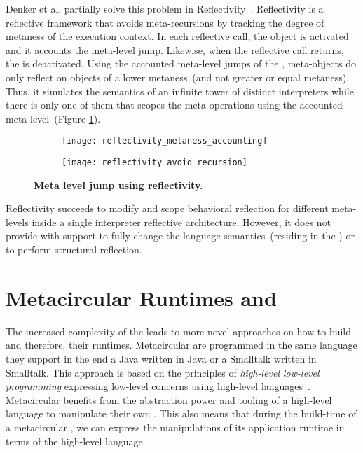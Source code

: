 Denker et al. partially solve this problem in Reflectivity~\cite{Denk08b}. Reflectivity is a reflective framework that avoids meta-recursions by tracking the degree of metaness of the execution context. In each reflective call, the  object is activated and it accounts the meta-level jump. Likewise, when the reflective call returns, the  is deactivated. Using the accounted meta-level jumps of the , meta-objects do only reflect on objects of a lower metaness~(and not greater or equal metaness). Thus, it simulates the semantics of an infinite tower of distinct interpreters while there is only one of them that scopes the meta-operations using the accounted meta-level~(Figure \ref{fig:reflectivity_avoid_meta_recursion}).

\begin{figure}[ht]
\begin{center}
\begin{subfigure}{.45\textwidth}
\texttt{[image: reflectivity\_metaness\_accounting]}
\end{subfigure}
\begin{subfigure}{.45\textwidth}
\texttt{[image: reflectivity\_avoid\_recursion]}
\end{subfigure}
\caption{\textbf{Meta level jump using reflectivity.}\label{fig:reflectivity_avoid_meta_recursion}
 }
\end{center}
\end{figure}

Reflectivity succeeds to modify and scope behavioral reflection for different meta-levels inside a single interpreter reflective architecture. However, it does not provide with support to fully change the language semantics~(residing in the \VM) or to perform structural reflection.

\section{Metacircular Runtimes and \VMs}\label{sec:metacircular_runtimes}

The increased complexity of the \VMs leads to more novel approaches on how to build \VMs and therefore, their runtimes.
Metacircular \VMs are \VMs programmed in the same language they support in the end \eg a Java \VM written in Java or a Smalltalk \VM written in Smalltalk. This approach is based on the principles of \emph{high-level low-level programming} \ie expressing low-level concerns using high-level languages~\cite{Fram09a}. Metacircular \VMs benefits from the abstraction power and tooling of a high-level language to manipulate their own \VMs. This also means that during the build-time of a metacircular \VM, we can express the manipulations of its application runtime in terms of the high-level language.

